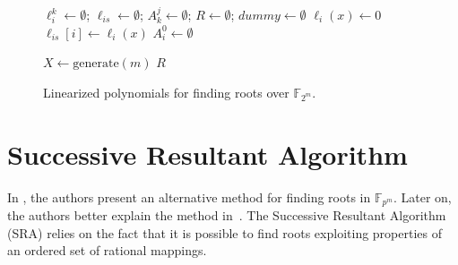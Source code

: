 \begin{figure}
\begin{algorithm}[H]
 $\ell^k_i \gets \emptyset$; $\ell_{is} \gets \emptyset$; $A^j_k \gets \emptyset$; $R \gets \emptyset$; $dummy \gets \emptyset$\;
 {
    $\ell_i(x) \gets 0$\;
    $\ell_{is}[i] \gets \ell_i(x)$\;
 }
 $A^0_i \gets \emptyset$\;

 $X \gets \text{generate}(m)$\;
\Return $R$\;
 \caption{Linearized polynomials for finding roots over $\mathbb{F}_{2^m}$.}
  \label{alg:linearized}
\end{algorithm}
\end{figure}

\section{Successive Resultant Algorithm}
In \cite{petit2014finding}, the authors present an alternative method for finding roots in $\mathbb{F}_{p^m}$. Later on, the authors better explain the method in~\cite{petit2016finding}. The Successive Resultant Algorithm (SRA) relies on the fact that it is possible to find roots exploiting properties of an ordered set of rational mappings.

